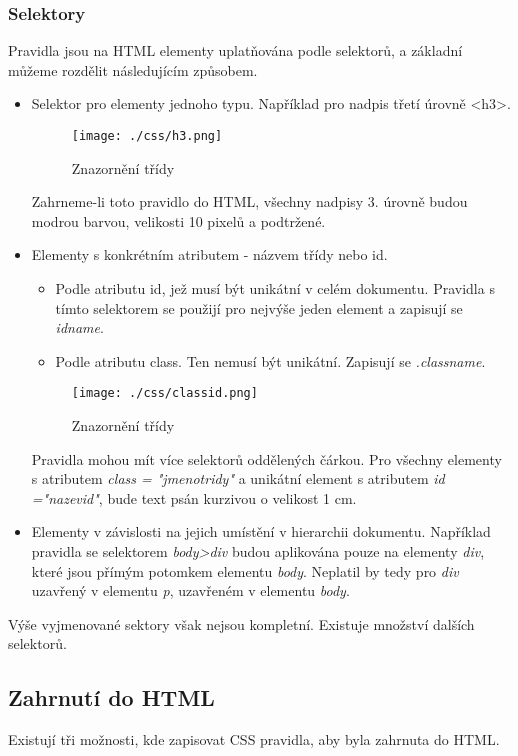 \documentclass[main.tex]{subfiles}
\begin{document}
	\subsubsection{Selektory}
Pravidla jsou na HTML elementy uplatňována podle selektorů, a základní můžeme rozdělit následujícím způsobem.
\begin{itemize}
	\item Selektor pro elementy jednoho typu. Například pro nadpis třetí úrovně <h3>.
		\begin{figure}[h]
			\centering
			\texttt{[image: ./css/h3.png]}
			\caption{Znazornění třídy}
		\end{figure}
		Zahrneme-li toto pravidlo do HTML, všechny nadpisy 3. úrovně budou modrou barvou, velikosti 10 pixelů a podtržené.
	\item Elementy s konkrétním atributem - názvem třídy nebo id.
		\begin{itemize}
			\item Podle atributu id, jež musí být unikátní v celém dokumentu. Pravidla s tímto selektorem se použijí pro nejvýše jeden element a zapisují se \textit{idname}. %
			\item Podle atributu class. Ten nemusí být unikátní. Zapisují se \textit{.classname}.
		\end{itemize}


		\begin{figure}[h]
			\centering
			\texttt{[image: ./css/classid.png]}
			\caption{Znazornění třídy}
		\end{figure}
		Pravidla mohou mít více selektorů oddělených čárkou. Pro všechny elementy s atributem \textit{class = "jmenotridy"} a unikátní element s atributem \textit{id ="nazevid"}, bude text psán kurzivou o velikost 1 cm.
	\item Elementy v závislosti na jejich umístění v hierarchii dokumentu. Například pravidla se selektorem \textit{body>div} budou aplikována pouze na elementy \textit{div}, které jsou přímým potomkem elementu \textit{body}. Neplatil by tedy pro \textit{div} uzavřený v elementu \textit{p}, uzavřeném v elementu \textit{body}.
\end{itemize}
Výše vyjmenované sektory však nejsou kompletní. Existuje množství dalších selektorů. \cite{web:cz:selektory}

\subsection{Zahrnutí do HTML}
Existují tři možnosti, kde zapisovat CSS pravidla, aby byla zahrnuta do HTML.
\end{document}

